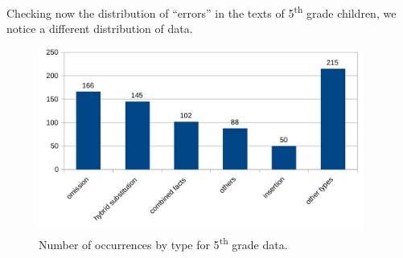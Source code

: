 
Checking now the distribution of ``errors'' in the texts of 5\textsuperscript{th} grade children, we notice a different distribution of data.

\begin{figure}[!ht]
\centering
\includegraphics[width=0.95\textwidth]{imgs/adelaideherci15-histograma5.pdf}
\caption{Number of occurrences by type for 5\textsuperscript{th} grade data.
}
\label{fig_5th}
\end{figure}


